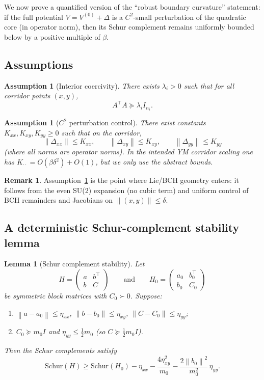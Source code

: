\documentclass[11pt]{article}
\newtheorem{lemma}[theorem]{Lemma}
\newtheorem{assumption}[theorem]{Assumption}
\theoremstyle{definition}
\newtheorem{remark}[theorem]{Remark}
\newcommand{\1}{\mathbf{1}}
\newcommand{\norm}[1]{\left\lVert#1\right\rVert}
\begin{document}
We now prove a quantified version of the ``robust boundary curvature'' statement: if the full potential $V=V^{(0)}+\Delta$ is a $C^2$-small perturbation of the quadratic core (in operator norm), then its Schur complement remains uniformly bounded below by a positive multiple of $\beta$.

\subsection{Assumptions}

\begin{assumption}[Interior coercivity]\label{ass:coerc}
There exists $\lambda_i>0$ such that for all corridor points $(x,y)$,
\[
A^\top A \succeq \lambda_i I_{n_i}.
\]
\end{assumption}

\begin{assumption}[$C^2$ perturbation control]\label{ass:C2}
There exist constants $K_{xx},K_{xy},K_{yy}\ge 0$ such that on the corridor,
\[
\norm{\Delta_{xx}}\le K_{xx},\qquad \norm{\Delta_{xy}}\le K_{xy},\qquad \norm{\Delta_{yy}}\le K_{yy}
\]
(where all norms are operator norms). In the intended YM corridor scaling one has $K_{\cdot\cdot}=O(\beta\delta^2)+O(1)$, but we only use the abstract bounds.
\end{assumption}

\begin{remark}
Assumption~\ref{ass:C2} is the point where Lie/BCH geometry enters: it follows from the even SU(2) expansion (no cubic term) and uniform control of BCH remainders and Jacobians on $\norm{(x,y)}\le \delta$.
\end{remark}

\subsection{A deterministic Schur-complement stability lemma}

\begin{lemma}[Schur complement stability]\label{lem:schur-stab}
Let
\[
H=\begin{pmatrix} a & b^\top\\ b & C\end{pmatrix}
\qquad\text{and}\qquad
H_0=\begin{pmatrix} a_0 & b_0^\top\\ b_0 & C_0\end{pmatrix}
\]
be symmetric block matrices with $C_0\succ 0$. Suppose:
\begin{enumerate}
\item $\norm{a-a_0}\le \eta_{xx}$, $\norm{b-b_0}\le \eta_{xy}$, $\norm{C-C_0}\le \eta_{yy}$;
\item $C_0\succeq m_0 I$ and $\eta_{yy}\le \tfrac12 m_0$ (so $C\succeq \tfrac12 m_0 I$).
\end{enumerate}
Then the Schur complements satisfy
\begin{equation}\label{eq:schur-stab}
\mathrm{Schur}(H)
\ge
\mathrm{Schur}(H_0)
-\eta_{xx}
-\frac{4\eta_{xy}^2}{m_0}
-\frac{2\norm{b_0}^2}{m_0^2}\,\eta_{yy}.
\end{equation}
\end{lemma}
\end{document}

